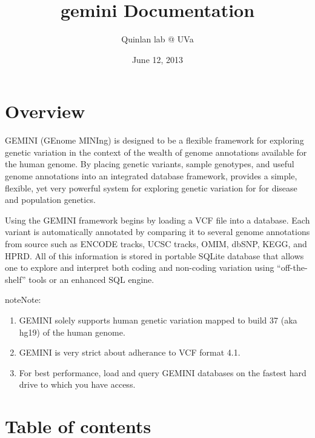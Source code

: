 \documentclass[letterpaper,10pt,english]{sphinxmanual}
\title{gemini Documentation}
\date{June 12, 2013}
\author{Quinlan lab @ UVa}
\begin{document}
\maketitle
\tableofcontents
{}\label{index::doc}



\chapter{Overview}
\label{index:overview}\label{index:gemini-a-flexible-framework-for-exploring-genome-variation}
GEMINI (GEnome MINIng) is designed to be a flexible framework for exploring genetic variation
in the context of the wealth of genome annotations available for the human genome.
By placing genetic variants, sample genotypes, and useful genome annotations into
an integrated database framework,  provides a simple, flexible, yet
very powerful system for exploring genetic variation for for disease and
population genetics.

Using the GEMINI framework begins by loading a VCF file into a
database.  Each variant is automatically annotated by comparing it to several
genome annotations from source such as ENCODE tracks, UCSC tracks, OMIM, dbSNP,
KEGG, and HPRD.  All of this information is stored in portable
SQLite database that allows one to explore and interpret both coding and
non-coding variation using ``off-the-shelf'' tools or an enhanced SQL engine.

\begin{notice}{note}{Note:}\begin{enumerate}
\item {} 
GEMINI solely supports human genetic variation mapped to build 37 (aka hg19) of the human genome.

\item {} 
GEMINI is very strict about adherance to VCF format 4.1.

\item {} 
For best performance, load and query GEMINI databases on the fastest hard drive to which you have access.

\end{enumerate}
\end{notice}


\chapter{Table of contents}
\label{index:table-of-contents}
\end{document}
